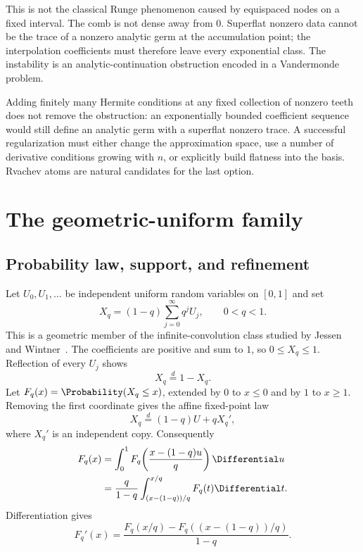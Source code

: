 \begin{remark}
This is not the classical Runge phenomenon caused by equispaced nodes on a
fixed interval.  The comb is not dense away from $0$.  Superflat nonzero data
cannot be the trace of a nonzero analytic germ at the accumulation point;
the interpolation coefficients must therefore leave every exponential class.
The instability is an analytic-continuation obstruction encoded in a
Vandermonde problem.
\end{remark}

\begin{remark}
Adding finitely many Hermite conditions at any fixed collection of nonzero
teeth does not remove the obstruction: an exponentially bounded coefficient
sequence would still define an analytic germ with a superflat nonzero trace.
A successful regularization must either change the approximation space, use a
number of derivative conditions growing with $n$, or explicitly build
flatness into the basis.  Rvachev atoms are natural candidates for the last
option.
\end{remark}


\section{The geometric-uniform family}
\label{g2:sec:geometric-uniform}

\subsection{Probability law, support, and refinement}

Let $U_0,U_1,\ldots$ be independent uniform random variables on $[0,1]$ and
set
\begin{equation}
 X_q=(1-q)\sum_{j=0}^\infty q^jU_j,
 \qquad 0<q<1.
 \label{g2:eq:Xq-definition}
\end{equation}
This is a geometric member of the infinite-convolution class studied by
Jessen and Wintner~\cite{JessenWintner1935}.  The coefficients are positive
and sum to $1$, so $0\le X_q\le1$.  Reflection
of every $U_j$ shows
\begin{equation}
 X_q\stackrel d=1-X_q.
 \label{g2:eq:Xq-symmetry}
\end{equation}
Let $F_q(x)=\Probability(X_q\le x)$, extended by $0$ to $x\le0$ and by $1$ to
$x\ge1$.  Removing the first coordinate gives the affine fixed-point law
\begin{equation}
 X_q\stackrel d=(1-q)U+qX_q',
 \label{g2:eq:Xq-fixed-point}
\end{equation}
where $X_q'$ is an independent copy.  Consequently
\begin{align}
 F_q(x)
 &=\int_0^1F_q\!\left(\frac{x-(1-q)u}{q}\right)\Differential u
 \label{g2:eq:Fq-integral-equation}\\
 &=\frac q{1-q}
 \int_{(x-(1-q))/q}^{x/q}F_q(t)\Differential t.
 \label{g2:eq:Fq-integral-equation-2}
\end{align}
Differentiation gives
\begin{equation}
 F_q'(x)=\frac{F_q(x/q)-F_q((x-(1-q))/q)}{1-q}.
 \label{g2:eq:Fq-derivative}
\end{equation}

